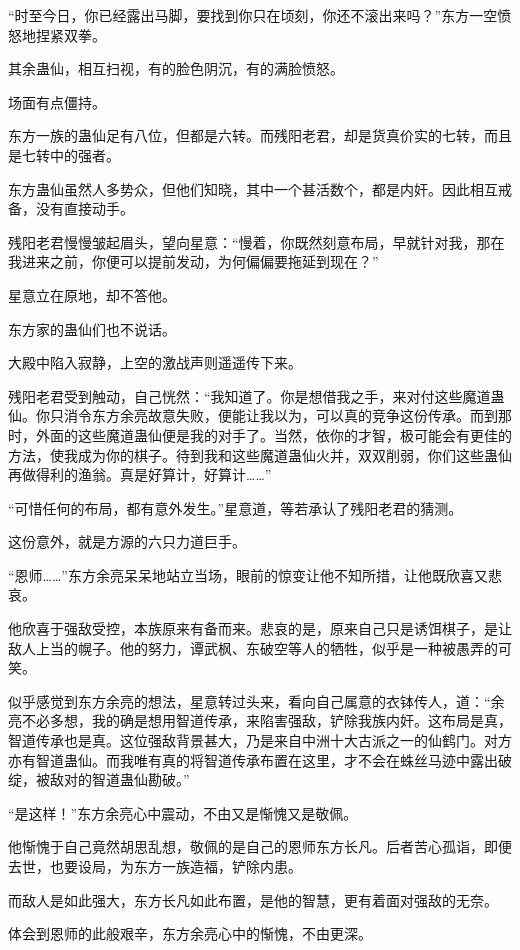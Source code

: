 \begin{this_body}
“时至今日，你已经露出马脚，要找到你只在顷刻，你还不滚出来吗？”东方一空愤怒地捏紧双拳。

其余蛊仙，相互扫视，有的脸色阴沉，有的满脸愤怒。

场面有点僵持。

东方一族的蛊仙足有八位，但都是六转。而残阳老君，却是货真价实的七转，而且是七转中的强者。

东方蛊仙虽然人多势众，但他们知晓，其中一个甚活数个，都是内奸。因此相互戒备，没有直接动手。

残阳老君慢慢皱起眉头，望向星意：“慢着，你既然刻意布局，早就针对我，那在我进来之前，你便可以提前发动，为何偏偏要拖延到现在？”

星意立在原地，却不答他。

东方家的蛊仙们也不说话。

大殿中陷入寂静，上空的激战声则遥遥传下来。

残阳老君受到触动，自己恍然：“我知道了。你是想借我之手，来对付这些魔道蛊仙。你只消令东方余亮故意失败，便能让我以为，可以真的竞争这份传承。而到那时，外面的这些魔道蛊仙便是我的对手了。当然，依你的才智，极可能会有更佳的方法，使我成为你的棋子。待到我和这些魔道蛊仙火并，双双削弱，你们这些蛊仙再做得利的渔翁。真是好算计，好算计……”

“可惜任何的布局，都有意外发生。”星意道，等若承认了残阳老君的猜测。

这份意外，就是方源的六只力道巨手。

“恩师……”东方余亮呆呆地站立当场，眼前的惊变让他不知所措，让他既欣喜又悲哀。

他欣喜于强敌受控，本族原来有备而来。悲哀的是，原来自己只是诱饵棋子，是让敌人上当的幌子。他的努力，谭武枫、东破空等人的牺牲，似乎是一种被愚弄的可笑。

似乎感觉到东方余亮的想法，星意转过头来，看向自己属意的衣钵传人，道：“余亮不必多想，我的确是想用智道传承，来陷害强敌，铲除我族内奸。这布局是真，智道传承也是真。这位强敌背景甚大，乃是来自中洲十大古派之一的仙鹤门。对方亦有智道蛊仙。而我唯有真的将智道传承布置在这里，才不会在蛛丝马迹中露出破绽，被敌对的智道蛊仙勘破。”

“是这样！”东方余亮心中震动，不由又是惭愧又是敬佩。

他惭愧于自己竟然胡思乱想，敬佩的是自己的恩师东方长凡。后者苦心孤诣，即便去世，也要设局，为东方一族造福，铲除内患。

而敌人是如此强大，东方长凡如此布置，是他的智慧，更有着面对强敌的无奈。

体会到恩师的此般艰辛，东方余亮心中的惭愧，不由更深。

\end{this_body}

